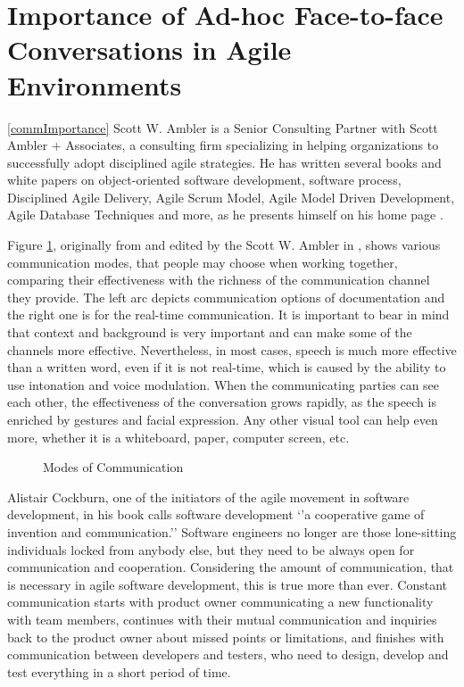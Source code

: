 \documentclass[11pt,singleside]{myfithesis2}
\newcommand{\pict}[4]{
	\begin{figure}[h!]
  		\vspace{-7px}
  		\centerline{\fcolorbox{darkgray}{palegray}{\texttt{[image: \#2]}}}
  		\caption{#1}
  		\label{#4}
	\end{figure}
}
\begin{document}
	\section{Importance of Ad-hoc Face-to-face Conversations in Agile Environments}\ref{commImportance}
Scott W. Ambler is a Senior Consulting Partner with Scott Ambler + Associates, a consulting firm specializing in helping organizations to successfully adopt disciplined agile strategies. He has written several books and white papers on object-oriented software development, software process, Disciplined Agile Delivery, Agile Scrum Model, Agile Model Driven Development, Agile Database Techniques and more, as he presents himself on his home page \cite{ambler}.

Figure \ref{pic:commModes}, originally from \cite{agileCockburn} and edited by the Scott W. Ambler in \cite{roninInt}, shows various communication modes, that people may choose when working together, comparing their effectiveness with the richness of the communication channel they provide. The left arc depicts communication options of documentation and the right one is for the real-time communication. It is important to bear in mind that context and background is very important and can make some of the channels more effective. Nevertheless, in most cases, speech is much more effective than a written word, even if it is not real-time, which is caused by the ability to use intonation and voice modulation. When the communicating parties can see each other, the effectiveness of the conversation grows rapidly, as the speech is enriched by gestures and facial expression. Any other visual tool can help even more, whether it is a whiteboard, paper, computer screen, etc.

\pict{Modes of Communication \cite{roninInt}}{data/communicationModes.png}{width=0.8\textwidth}{pic:commModes}

Alistair Cockburn, one of the initiators of the agile movement in software development, in his book \cite{commCockburn} calls software development `'a cooperative game of invention and communication.'' Software engineers no longer are those lone-sitting individuals locked from anybody else, but they need to be always open for communication and cooperation. Considering the amount of communication, that is necessary in agile software development, this is true more than ever. Constant communication starts with product owner communicating a new functionality with team members, continues with their mutual communication and inquiries back to the product owner about missed points or limitations, and finishes with communication between developers and testers, who need to design, develop and test everything in a short period of time. 
\end{document}
